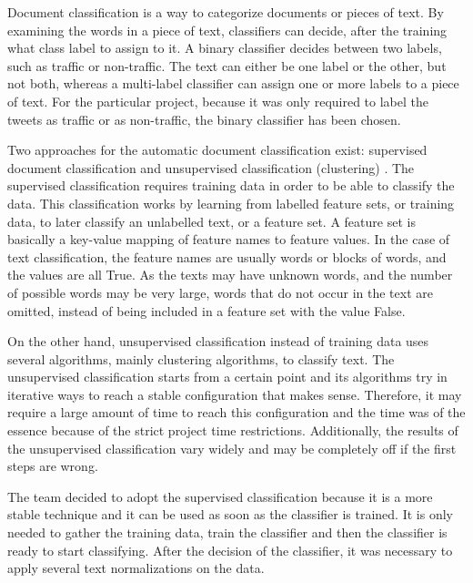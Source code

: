 Document classification is a way to categorize documents or pieces of text. By examining the words in a piece of text, classifiers can decide, after the training what class label to assign to it. A binary classifier decides between two labels, such as traffic or non-traffic. The text can either be one label or the other, but not both, whereas a multi-label classifier can assign one or more labels to a piece of text. For the particular project, because it was only required to label the tweets as traffic or as non-traffic, the binary classifier has been chosen.

Two approaches for the automatic document classification exist: supervised document classification and unsupervised classification (clustering) \cite{Liu}.  The supervised classification requires training data in order to be able to classify the data. This classification works by learning from labelled feature sets, or training data, to later classify an unlabelled text, or a feature set. A feature set is basically a key-value mapping of feature names to feature values. In the case of text classification, the feature names are usually words or blocks of words, and the values are all True. As the texts may have unknown words, and the number of possible words may be very large, words that do not occur in the text are omitted, instead of being included in a feature set with the value False.

On the other hand, unsupervised classification instead of training data uses several algorithms, mainly clustering algorithms, to classify text. The unsupervised classification starts from a certain point and its algorithms try in iterative ways to reach a stable configuration that makes sense. Therefore, it may require a large amount of time to reach this configuration and the time was of the essence because of the strict project time restrictions. Additionally, the results of the unsupervised classification vary widely and may be completely off if the first steps are wrong.

The team decided to adopt the supervised classification because it is a more stable technique and it can be used as soon as the classifier is trained. It is only needed to gather the training data, train the classifier and then the classifier is ready to start classifying. After the decision of the classifier, it was necessary to apply several text normalizations on the data. 

